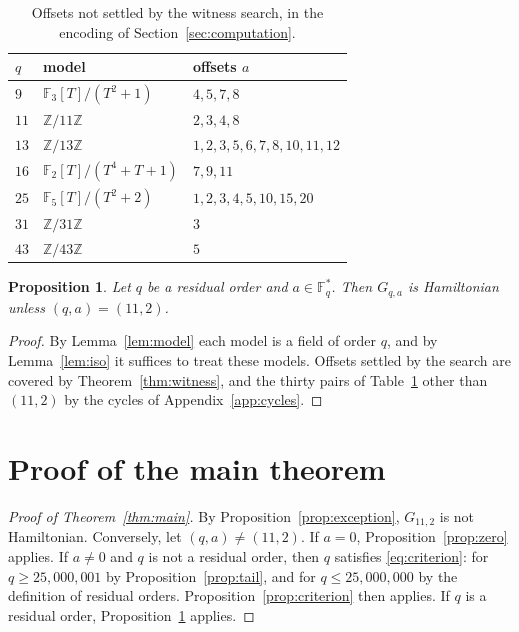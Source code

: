 \documentclass{amsart}
\newtheorem{proposition}[theorem]{Proposition}
\theoremstyle{remark}
\numberwithin{equation}{section}
\numberwithin{table}{section}
\newcommand{\F}{\mathbb{F}}
\begin{document}
\begin{table}[ht]
\caption{Offsets not settled by the witness search, in the encoding of Section~\ref{sec:computation}.}\label{tab:unsettled}
\centering
\begin{tabular}{@{}lll@{}}
\toprule
$q$ & model & offsets $a$\\
\midrule
$9$ & $\F_3[T]/(T^{2}+1)$ & $4,5,7,8$\\
$11$ & $\mathbb Z/11\mathbb Z$ & $2,3,4,8$\\
$13$ & $\mathbb Z/13\mathbb Z$ & $1,2,3,5,6,7,8,10,11,12$\\
$16$ & $\F_2[T]/(T^{4}+T+1)$ & $7,9,11$\\
$25$ & $\F_5[T]/(T^{2}+2)$ & $1,2,3,4,5,10,15,20$\\
$31$ & $\mathbb Z/31\mathbb Z$ & $3$\\
$43$ & $\mathbb Z/43\mathbb Z$ & $5$\\
\bottomrule
\end{tabular}
\end{table}

\begin{proposition}\label{prop:finite}
Let $q$ be a residual order and $a\in\F_q^{*}$. Then $G_{q,a}$ is Hamiltonian unless $(q,a)=(11,2)$.
\end{proposition}

\begin{proof}
By Lemma~\ref{lem:model} each model is a field of order $q$, and by Lemma~\ref{lem:iso} it suffices to treat these models. Offsets settled by the search are covered by Theorem~\ref{thm:witness}, and the thirty pairs of Table~\ref{tab:unsettled} other than $(11,2)$ by the cycles of Appendix~\ref{app:cycles}.
\end{proof}

\section{Proof of the main theorem}\label{sec:proof}

\begin{proof}[Proof of Theorem~\ref{thm:main}]
By Proposition~\ref{prop:exception}, $G_{11,2}$ is not Hamiltonian. Conversely, let $(q,a)\neq(11,2)$. If $a=0$, Proposition~\ref{prop:zero} applies. If $a\neq0$ and $q$ is not a residual order, then $q$ satisfies \eqref{eq:criterion}: for $q\ge25{,}000{,}001$ by Proposition~\ref{prop:tail}, and for $q\le 25{,}000{,}000$ by the definition of residual orders. Proposition~\ref{prop:criterion} then applies. If $q$ is a residual order, Proposition~\ref{prop:finite} applies.
\end{proof}
\end{document}
